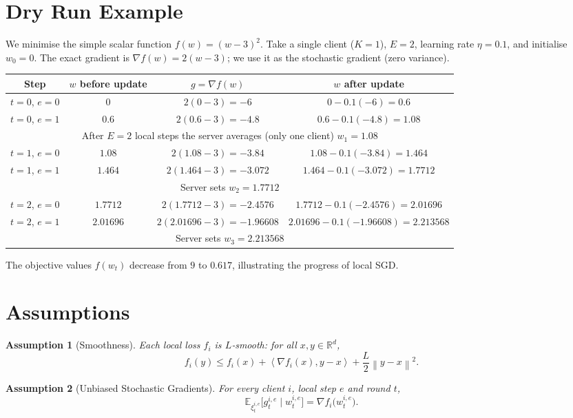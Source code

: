 \documentclass{article}
\newtheorem{assumption}{Assumption}
\newcommand{\E}{\mathbb{E}}
\newcommand{\R}{\mathbb{R}}
\newcommand{\norm}[1]{\left\lVert#1\right\rVert}
\newcommand{\inner}[2]{\left\langle #1,#2\right\rangle}
\begin{document}
\section*{Dry Run Example}
We minimise the simple scalar function $f(w)=(w-3)^2$.
Take a single client ($K=1$), $E=2$, learning rate $\eta=0.1$, and initialise $w_0=0$.
The exact gradient is $\nabla f(w)=2(w-3)$; we use it as the stochastic gradient (zero variance).

\begin{center}
\begin{tabular}{c|c|c|c}
Step & $w$ before update & $g=\nabla f(w)$ & $w$ after update \\ \hline
$t=0$, $e=0$ & $0$ & $2(0-3)=-6$ & $0-0.1(-6)=0.6$\\
$t=0$, $e=1$ & $0.6$ & $2(0.6-3)=-4.8$ & $0.6-0.1(-4.8)=1.08$\\
\multicolumn{4}{c}{After $E=2$ local steps the server averages (only one client) $w_1=1.08$}\\ \hline
$t=1$, $e=0$ & $1.08$ & $2(1.08-3)=-3.84$ & $1.08-0.1(-3.84)=1.464$\\
$t=1$, $e=1$ & $1.464$ & $2(1.464-3)=-3.072$ & $1.464-0.1(-3.072)=1.7712$\\
\multicolumn{4}{c}{Server sets $w_2=1.7712$}\\ \hline
$t=2$, $e=0$ & $1.7712$ & $2(1.7712-3)=-2.4576$ & $1.7712-0.1(-2.4576)=2.01696$\\
$t=2$, $e=1$ & $2.01696$ & $2(2.01696-3)=-1.96608$ & $2.01696-0.1(-1.96608)=2.213568$\\
\multicolumn{4}{c}{Server sets $w_3=2.213568$}
\end{tabular}
\end{center}
The objective values $f(w_t)$ decrease from $9$ to $0.617$, illustrating the progress of local SGD.

\newpage
\section*{Assumptions}
\begin{assumption}[Smoothness]\label{ass:smooth}
Each local loss $f_i$ is $L$‑smooth: for all $x,y\in\R^d$,
\[
f_i(y)\le f_i(x)+\inner{\nabla f_i(x)}{y-x}+\frac{L}{2}\norm{y-x}^2 .
\]
\end{assumption}

\begin{assumption}[Unbiased Stochastic Gradients]\label{ass:unbiased}
For every client $i$, local step $e$ and round $t$,
\[
\E_{\xi_{t}^{i,e}}\!\bigl[g_{t}^{i,e}\mid w_{t}^{i,e}\bigr]=\nabla f_i\!\bigl(w_{t}^{i,e}\bigr).
\]
\end{assumption}
\end{document}
